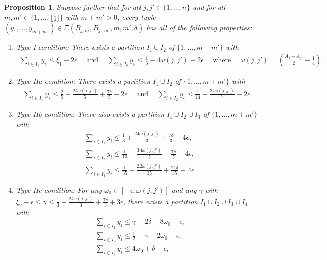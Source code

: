\documentclass{amsart}
\newtheorem{prop}{Proposition}
\numberwithin{equation}{section}
\begin{document}
\begin{prop}
\smallskip 
Suppose further that for all $j, j'\in \{1, \dots, n\}$ and for all $m, m' \in \{1, \dots, \lfloor \frac{1}{\delta} \rfloor\}$ with $m+m'>0$, every   tuple  $(y_1, \dots, y_{m+m'}) \in \Xi(B_{j,m},B_{j',m'},m,m',\delta)$ has all of the following properties: 
\begin{enumerate}[{\rm (A)}]
\item Type I condition: There exists a partition $I_1 \cup I_2$ of $\{1, \dots, m+m'\}$ with  
\begin{align*}
\sum_{i \in I_1} y_i \leq \xi_1-2\epsilon \quad \mbox{ and } \quad  \sum_{i \in I_2} y_i \leq  \frac{1}{6}-   4 \omega(j,j')  -2\epsilon \quad \mbox{ where } \quad  \omega(j,j')=\left( \frac{A_j + A_{j'}}{2}  - \frac{1}{4} \right)  . 
\end{align*}
\item Type IIa condition: 
 There exists a partition $I_1 \cup I_2$ of $\{1, \dots, m+m'\}$ with  
\begin{align*}
\sum_{i \in I_1} y_i \leq \frac{2}{5}+\frac{24\omega(j,j')}{5} +\frac{7\delta}{5}   -2 \epsilon \quad \mbox{ and } \quad  \sum_{i \in I_2} y_i \leq \frac{1}{14}     -\frac{24\omega(j,j')}{7} -2\epsilon.
\end{align*}
\item Type IIb condition:
There also exists a partition $I_1 \cup I_2 \cup I_3$ of $\{1, \dots, m+m'\}$ with 
 \begin{align*}
 &\sum_{i \in I_1} y_i \leq  \frac{1}{3}+\frac{24\omega(j,j')}{3} +\frac{7\delta}{3}   -4\epsilon, \\  &\sum_{i \in I_2} y_i \leq    
  \frac{1}{10}-\frac{34\omega(j,j')}{5} -\frac{7\delta}{5}    
 -4 \epsilon,  \nonumber  \\
&\sum_{i \in I_3} y_i \leq            \frac{1}{35}+\frac{22\omega(j,j')}{35} +\frac{21\delta}{35}     - 4\epsilon . \nonumber
\end{align*}
\item Type IIc condition: For any $\omega_0 \in [-\epsilon, \omega(j,j')]$ and any $\gamma$ with $\xi_2 -\epsilon \leq \gamma \leq  \tfrac{1}{3}+\tfrac{24\omega(j,j')}{3} +\tfrac{7\delta}{3}  +3\epsilon$, 
there   exists a partition $I_1 \cup I_2 \cup I_3 \cup I_4$   with 
\begin{align*}
&\sum_{i \in I_1} y_i \leq   \gamma-2\delta       -    8\omega_0    -\epsilon, \\
  &\sum_{i \in I_2} y_i \leq  \frac{1}{2}-\gamma- 2\omega_0 -\epsilon, \\
   &\sum_{i \in I_3} y_i \leq  4\omega_0   +\delta    -\epsilon ,\\

\end{align*}
\end{enumerate}
\end{prop}
\end{document}

